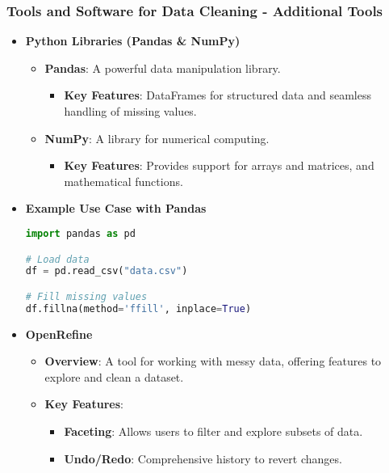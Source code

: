 \documentclass[aspectratio=169]{beamer}
\begin{document}
\begin{frame}[fragile]
    \frametitle{Tools and Software for Data Cleaning - Additional Tools}
    \begin{itemize}
        \item \textbf{Python Libraries (Pandas \& NumPy)}
        \begin{itemize}
            \item \textbf{Pandas}: A powerful data manipulation library.
            \begin{itemize}
                \item \textbf{Key Features}: DataFrames for structured data and seamless handling of missing values.
            \end{itemize}
            \item \textbf{NumPy}: A library for numerical computing.
            \begin{itemize}
                \item \textbf{Key Features}: Provides support for arrays and matrices, and mathematical functions.
            \end{itemize}
        \end{itemize}
        
        \item \textbf{Example Use Case with Pandas}
        \begin{lstlisting}[language=python]
import pandas as pd

# Load data
df = pd.read_csv("data.csv")

# Fill missing values
df.fillna(method='ffill', inplace=True)
        \end{lstlisting}
        
        \item \textbf{OpenRefine}
        \begin{itemize}
            \item \textbf{Overview}: A tool for working with messy data, offering features to explore and clean a dataset.
            \item \textbf{Key Features}:
            \begin{itemize}
                \item \textbf{Faceting}: Allows users to filter and explore subsets of data.
                \item \textbf{Undo/Redo}: Comprehensive history to revert changes.
            \end{itemize}
        \end{itemize}
        

\end{itemize}
\end{frame}
\end{document}
